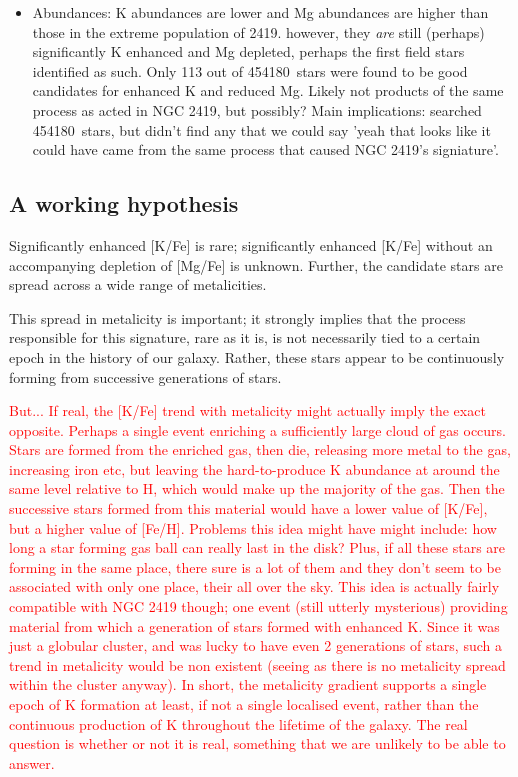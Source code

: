 \documentclass[a4paper,fleqn,usenatbib]{mnras}
\newcommand{\todo}[1]{\textcolor{red}{#1}}
\newcommand{\LamostGiants}{454180}
\begin{document}
\begin{itemize}
\item Abundances: K abundances are lower and Mg abundances are higher than those in the extreme population of 2419. however, they \textit{are} still (perhaps) significantly K enhanced and Mg depleted, perhaps the first field stars identified as such. Only 113 out of \LamostGiants \ stars were found to be good candidates for enhanced K and reduced Mg. Likely not products of the same process as acted in NGC 2419, but possibly? Main implications: searched \LamostGiants \ stars, but didn't find any that we could say 'yeah that looks like it could have came from the same process that caused NGC 2419's signiature'.

\end{itemize}

\subsection{A working hypothesis}
Significantly enhanced [K/Fe] is rare; significantly enhanced [K/Fe] without an accompanying depletion of [Mg/Fe] is unknown. Further, the candidate stars are spread across a wide range of metalicities.

This spread in metalicity is important; it strongly implies that the process responsible for this signature, rare as it is, is not necessarily tied to a certain epoch in the history of our galaxy. Rather, these stars appear to be continuously forming from successive generations of stars. 

\todo{But... If real, the [K/Fe] trend with metalicity might actually imply the exact opposite. Perhaps a single event enriching a sufficiently large cloud of gas occurs. Stars are formed from the enriched gas, then die, releasing more metal to the gas, increasing iron etc, but leaving the hard-to-produce K abundance at around the same level relative to H, which would make up the majority of the gas. Then the successive stars formed from this material would have a lower value of [K/Fe], but a higher value of [Fe/H]. Problems this idea might have might include: how long a star forming gas ball can really last in the disk? Plus, if all these stars are forming in the same place, there sure is a lot of them and they don't seem to be associated with only one place, their all over the sky. This idea is actually fairly compatible with NGC 2419 though; one event (still utterly mysterious) providing material from which a generation of stars formed with enhanced K. Since it was just a globular cluster, and was lucky to have even 2 generations of stars, such a trend in metalicity would be non existent (seeing as there is no metalicity spread within the cluster anyway). In short, the metalicity gradient supports a single epoch of K formation at least, if not a single localised event, rather than the continuous production of K throughout the lifetime of the galaxy. The real question is whether or not it is real, something that we are unlikely to be able to answer.}
\end{document}
